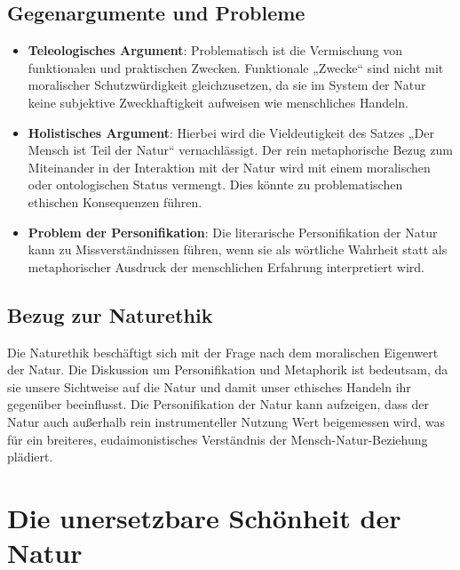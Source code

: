 \documentclass{article}
\begin{document}
\subsection*{Gegenargumente und Probleme}
\begin{itemize}
	\item \textbf{Teleologisches Argument}: Problematisch ist die Vermischung von funktionalen und praktischen Zwecken. Funktionale „Zwecke“ sind nicht mit moralischer Schutzwürdigkeit gleichzusetzen, da sie im System der Natur keine subjektive Zweckhaftigkeit aufweisen wie menschliches Handeln.

	\item \textbf{Holistisches Argument}: Hierbei wird die Vieldeutigkeit des Satzes „Der Mensch ist Teil der Natur“ vernachlässigt. Der rein metaphorische Bezug zum Miteinander in der Interaktion mit der Natur wird mit einem moralischen oder ontologischen Status vermengt. Dies könnte zu problematischen ethischen Konsequenzen führen.

	\item \textbf{Problem der Personifikation}: Die literarische Personifikation der Natur kann zu Missverständnissen führen, wenn sie als wörtliche Wahrheit statt als metaphorischer Ausdruck der menschlichen Erfahrung interpretiert wird.
\end{itemize}

\subsection*{Bezug zur Naturethik}
Die Naturethik beschäftigt sich mit der Frage nach dem moralischen Eigenwert der Natur. Die Diskussion um Personifikation und Metaphorik ist bedeutsam, da sie unsere Sichtweise auf die Natur und damit unser ethisches Handeln ihr gegenüber beeinflusst. Die Personifikation der Natur kann aufzeigen, dass der Natur auch außerhalb rein instrumenteller Nutzung Wert beigemessen wird, was für ein breiteres, eudaimonistisches Verständnis der Mensch-Natur-Beziehung plädiert.


\newpage
\section{Die unersetzbare Schönheit der Natur}
\end{document}
